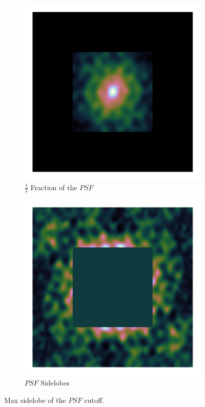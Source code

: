 \begin{figure}[h]
	\centering
	\begin{subfigure}[b]{0.3\linewidth}
		\includegraphics[width=\linewidth, clip, trim= 0.25in 0.25in 0.25in 0.25in]{./chapters/03.cd/simulated/psfCut.png}
		\caption{$\frac{1}{2}$ Fraction of the $PSF$}
	\end{subfigure}
	\begin{subfigure}[b]{0.3\linewidth}
		\includegraphics[width=\linewidth, clip, trim= 0.25in 0.25in 0.25in 0.25in]{./chapters/03.cd/simulated/psfReverseCut.png}
		\caption{$PSF$ Sidelobes}
		\label{gradient:convergence:reverseCut}
	\end{subfigure}
	
	\caption{Max sidelobe of the $PSF$ cutoff.}
	\label{gradient:convergence:sidelobe}
\end{figure}

